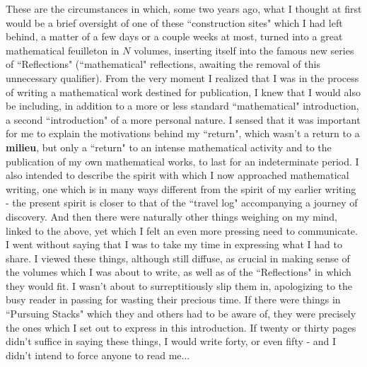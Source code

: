 These are the circumstances in which, some two years ago, what I thought at first would be a brief oversight of one of these ``construction sites" which I had left behind, a matter of a few days or a couple weeks at most, turned into a great mathematical feuilleton in $N$ volumes, inserting itself into the famous new series of ``Reflections" (``mathematical" reflections, awaiting the removal of this unnecessary qualifier). From the very moment I realized that I was in the process of writing a mathematical work destined for publication, I knew that I would also be including, in addition to a more or less standard ``mathematical" introduction, a second ``introduction" of a more personal nature. I sensed that it was important for me to explain the motivations behind my ``return", which wasn't a return to a \textbf{milieu}, but only a ``return" to an intense mathematical activity and to the publication of my own mathematical works, to last for an indeterminate period. I also intended to describe the spirit with which I now approached mathematical writing, one which is in many ways different from the spirit of my earlier writing - the present spirit is closer to that of the ``travel log" accompanying a journey of discovery. And then there were naturally other things weighing on my mind, linked to the above, yet which I felt an even more pressing need to communicate. I went without saying that I was to take my time in expressing what I had to share. I viewed these things, although still diffuse, as crucial in making sense of the volumes which I was about to write, as well as of the ``Reflections" in which they would fit. I wasn't about to surreptitiously slip them in, apologizing to the busy reader in passing for wasting their precious time. If there were things in ``Pursuing Stacks" which they and others had to be aware of, they were precisely the ones which I set out to express in this introduction. If twenty or thirty pages didn't suffice in saying these things, I would write forty, or even fifty - and I didn't intend to force anyone to read me...

